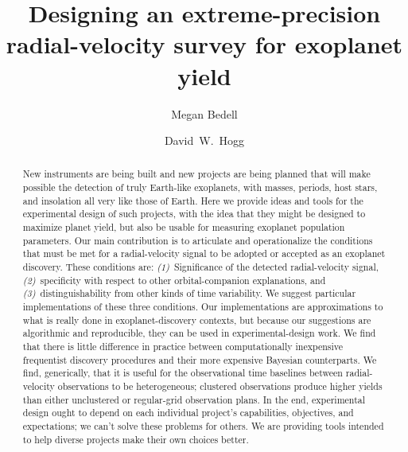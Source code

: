 \documentclass[modern]{aastex63}
\begin{document}
\title{Designing an extreme-precision radial-velocity survey for exoplanet yield}

\author[0000-0001-9907-7742]{Megan Bedell}

\author[0000-0003-2866-9403]{David~W.~Hogg}

\begin{abstract}\noindent
New instruments are being built and new projects are being planned
that will make possible the detection of truly Earth-like exoplanets,
with masses, periods, host stars, and insolation all very like those of
Earth.
Here we provide ideas and tools for the experimental design of such
projects, with the idea that they might be designed to maximize planet
yield, but also be usable for measuring exoplanet population
parameters.
Our main contribution is to articulate and operationalize the
conditions that must be met for a radial-velocity signal to be adopted
or accepted as an exoplanet discovery.
These conditions are:
\textsl{(1)}~Significance of the detected radial-velocity signal,
\textsl{(2)}~specificity with respect to other orbital-companion explanations, and
\textsl{(3)}~distinguishability from other kinds of time variability.
We suggest particular implementations of these three conditions.
Our implementations are approximations to what is really done in
exoplanet-discovery contexts, but because our suggestions are
algorithmic and reproducible, they can be used in experimental-design
work.
We find that there is little difference in practice between
computationally inexpensive frequentist discovery procedures and their
more expensive Bayesian counterparts.
We find, generically, that it is useful for the observational time
baselines between radial-velocity observations to be heterogeneous;
clustered observations produce higher yields than either unclustered
or regular-grid observation plans.
In the end, experimental design ought to depend on each individual
project's capabilities, objectives, and expectations; we can't solve
these problems for others. We are providing tools intended to help
diverse projects make their own choices better.
\end{abstract}
\end{document}
